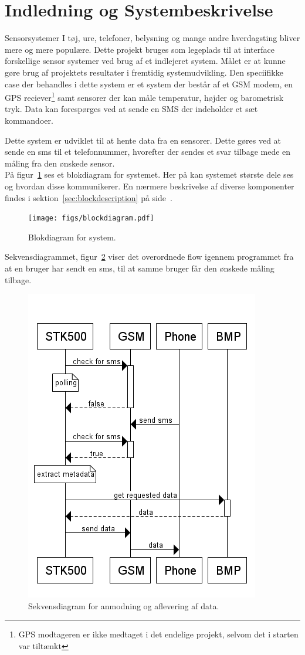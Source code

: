\section{Indledning og Systembeskrivelse}

Sensorsystemer I tøj, ure, telefoner, belysning og mange andre hverdagsting bliver mere og mere populære. Dette projekt bruges som 
legeplads til at interface forskellige sensor systemer ved brug af et indlejeret system. Målet er at kunne gøre brug af projektets 
resultater i fremtidig systemudvikling. Den speciifikke case der behandles i dette system er et system der består af et GSM modem, 
en GPS reciever\footnote{GPS modtageren er ikke medtaget i det endelige projekt, selvom det i starten var tiltænkt} samt sensorer der kan måle temperatur, 
højder og barometrisk tryk. Data kan forespørges ved at sende en SMS der indeholder et sæt kommandoer.

Dette system er udviklet til at hente data fra en sensorer. Dette gøres ved at sende en sms til et telefonnummer, hvorefter der 
sendes et svar tilbage mede en måling fra den ønskede sensor.\\

På figur~\ref{fig:blockdiagram} ses et blokdiagram for systemet. Her på kan systemet største dele ses og hvordan disse kommunikerer. 
En nærmere beskrivelse af diverse komponenter findes i sektion~\ref{sec:blockdescription} på side~\pageref{sec:blockdescription}.

\vskip 0.5cm
\begin{figure}[h]
	\centering
	\texttt{[image: figs/blockdiagram.pdf]}
	\caption{Blokdiagram for system.}
	\label{fig:blockdiagram}
\end{figure}
\vskip 0.5cm

Sekvensdiagrammet, figur~\ref{fig:seq-getdata} viser det overordnede flow igennem programmet fra at en bruger har sendt en sms, til at samme bruger får den ønskede måling tilbage.

\begin{figure}[h]
	\centering
	\includegraphics[width=0.56\linewidth]{figs/seq-getdata.png}
	\caption{Sekvensdiagram for anmodning og aflevering af data.}
	\label{fig:seq-getdata}
\end{figure}

